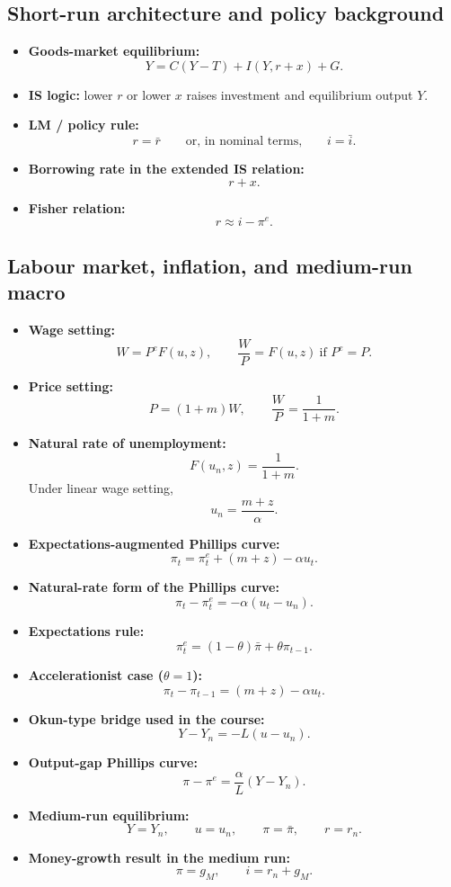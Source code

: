 \documentclass[12pt]{article}
\begin{document}
\subsection*{Short-run architecture and policy background}

\begin{itemize}[leftmargin=1.5em]
\item \textbf{Goods-market equilibrium:}
\[
Y=C(Y-T)+I(Y,r+x)+G.
\]
\item \textbf{IS logic:} lower \(r\) or lower \(x\) raises investment and equilibrium output \(Y\).
\item \textbf{LM / policy rule:}
\[
r=\bar r
\qquad\text{or, in nominal terms,}\qquad
i=\bar i.
\]
\item \textbf{Borrowing rate in the extended IS relation:}
\[
r+x.
\]
\item \textbf{Fisher relation:}
\[
r\approx i-\pi^e.
\]
\end{itemize}

\subsection*{Labour market, inflation, and medium-run macro}

\begin{itemize}[leftmargin=1.5em]
\item \textbf{Wage setting:}
\[
W=P^eF(u,z),
\qquad
\frac{W}{P}=F(u,z)\ \text{if } P^e=P.
\]
\item \textbf{Price setting:}
\[
P=(1+m)W,
\qquad
\frac{W}{P}=\frac{1}{1+m}.
\]
\item \textbf{Natural rate of unemployment:}
\[
F(u_n,z)=\frac{1}{1+m}.
\]
Under linear wage setting,
\[
u_n=\frac{m+z}{\alpha}.
\]
\item \textbf{Expectations-augmented Phillips curve:}
\[
\pi_t=\pi_t^e+(m+z)-\alpha u_t.
\]
\item \textbf{Natural-rate form of the Phillips curve:}
\[
\pi_t-\pi_t^e=-\alpha(u_t-u_n).
\]
\item \textbf{Expectations rule:}
\[
\pi_t^e=(1-\theta)\bar{\pi}+\theta\pi_{t-1}.
\]
\item \textbf{Accelerationist case (\(\theta=1\)):}
\[
\pi_t-\pi_{t-1}=(m+z)-\alpha u_t.
\]
\item \textbf{Okun-type bridge used in the course:}
\[
Y-Y_n=-L(u-u_n).
\]
\item \textbf{Output-gap Phillips curve:}
\[
\pi-\pi^e=\frac{\alpha}{L}(Y-Y_n).
\]
\item \textbf{Medium-run equilibrium:}
\[
Y=Y_n,\qquad u=u_n,\qquad \pi=\bar{\pi},\qquad r=r_n.
\]
\item \textbf{Money-growth result in the medium run:}
\[
\pi=g_M,
\qquad
i=r_n+g_M.
\]
\end{itemize}
\end{document}
